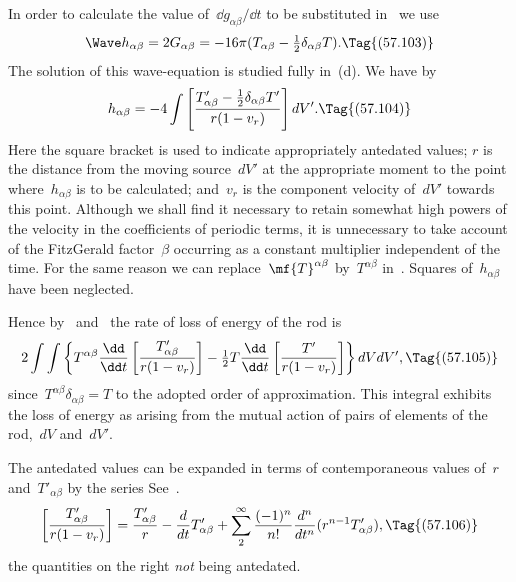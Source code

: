 \documentclass[12pt]{book}
\begin{document}
In order to calculate the value of~$\dd g_{\alpha\beta}/\dd t$ to be substituted in~ we use~
\[
\Wave h_{\alpha\beta} = 2 G_{\alpha\beta} = -16\pi(T_{\alpha\beta} - \tfrac{1}{2}\delta_{\alpha\beta} T).
\Tag{(57.103)}
\]
The solution of this wave-equation is studied fully in~(d).
We have by~
\[
h_{\alpha\beta} = -4 \int\left[\frac{T'_{\alpha\beta} - \tfrac{1}{2}\delta_{\alpha\beta} T'}{r(1-v_r)}\right] dV'.
\Tag{(57.104)}
\]
Here the square bracket is used to indicate appropriately antedated values; $r$ is the distance from the moving
source~$dV'$ at the appropriate moment to the point where~$h_{\alpha\beta}$ is to be calculated;
and~$v_r$ is the component velocity of~$dV'$ towards this point.
Although we shall find it necessary to retain somewhat high powers of the velocity in the coefficients of
periodic terms, it is unnecessary to take account of the FitzGerald factor~$\beta$ occurring as a constant multiplier
independent of the time.
For the same reason we can replace~$\mf{T}^{\alpha\beta}$ by~$T^{\alpha\beta}$ in~.
Squares of~$h_{\alpha\beta}$ have been neglected.

Hence by~ and~ the rate of loss of energy of the rod is
\[
2\int\int\left\{T^{\alpha\beta}\frac{\dd}{\dd t}\left[\frac{T'_{\alpha\beta}}{r(1-v_r)}\right] - \tfrac{1}{2} T\frac{\dd}{\dd t}\left[\frac{T'}{r(1-v_r)}\right]\right\} dV dV',
\Tag{(57.105)}
\]
since~$T^{\alpha\beta}\delta_{\alpha\beta}=T$ to the adopted order of approximation.
This integral exhibits the loss of energy as arising from the mutual action of pairs of elements of
the rod,~$dV$ and~$dV'$.

The antedated values can be expanded in terms of contemporaneous values of~$r$ and~$T'_{\alpha\beta}$
by the series\footnotemark\footnotetext
      {See~.}
\[
\left[\frac{T'_{\alpha\beta}}{r(1-v_r)}\right] = \frac{T'_{\alpha\beta}}{r} - \frac{d}{dt}T'_{\alpha\beta} +
                 \sum_2^\infty\frac{(-1)^n}{n!}\frac{d^n}{dt^n}(r^{n-1}T'_{\alpha\beta}),
\Tag{(57.106)}
\]
the quantities on the right \emph{not} being antedated.
\end{document}
